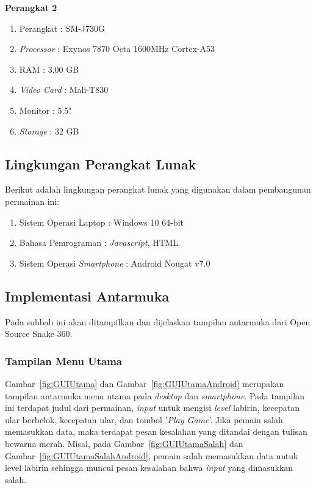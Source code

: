 \textbf{Perangkat 2}
\begin{enumerate}
	\item Perangkat : SM-J730G
	\item \textit{Processor} : Exynos 7870 Octa 1600MHz Cortex-A53
	\item RAM : 3.00 GB
	\item \textit{Video Card} : Mali-T830
	\item Monitor : 5.5"
	\item \textit{Storage} : 32 GB
\end{enumerate}

\subsection{Lingkungan Perangkat Lunak}
Berikut adalah lingkungan perangkat lunak yang digunakan dalam pembangunan permainan ini:

\begin{enumerate}
	\item Sistem Operasi Laptop : Windows 10 64-bit
	\item Bahasa Pemrograman : \textit{Javascript}, HTML
	\item Sistem Operasi \textit{Smartphone} : Android Nougat v7.0
\end{enumerate}

\subsection{Implementasi Antarmuka}
Pada subbab ini akan ditampilkan dan dijelaskan tampilan antarmuka dari Open Source Snake 360. 

\subsubsection{Tampilan Menu Utama}
Gambar~\ref{fig:GUIUtama} dan Gambar~\ref{fig:GUIUtamaAndroid} merupakan tampilan antarmuka menu utama pada \textit{desktop} dan \textit{smartphone}. Pada tampilan ini terdapat judul dari permainan, \textit{input} untuk mengisi \textit{level} labirin, kecepatan ular berbelok, kecepatan ular, dan tombol '\textit{Play Game}'. Jika pemain salah memasukkan data, maka terdapat pesan kesalahan yang ditandai dengan tulisan bewarna merah. Misal, pada Gambar~\ref{fig:GUIUtamaSalah} dan Gambar~\ref{fig:GUIUtamaSalahAndroid}, pemain salah memasukkan data untuk level labirin sehingga muncul pesan kesalahan bahwa \textit{input} yang dimasukkan salah.

